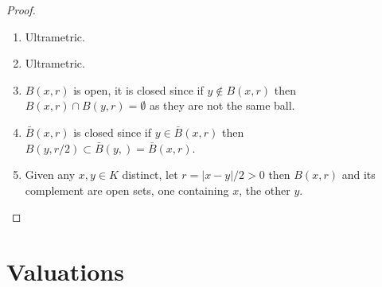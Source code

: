 \documentclass[10pt,]{book}
\newcommand{\gt}{>}
\theoremstyle{plain}
\theoremstyle{definition}
\begin{document}
\begin{proof}
\begin{enumerate}
\item{}Ultrametric.\item{}Ultrametric.\item{}\(B(x,r)\) is open, it is closed since if \(y \not\in B(x,r)\) then \(B(x,r)\cap B(y,r) = \emptyset\) as they are not the same ball.\item{}\(\bar{B}(x,r)\) is closed since if \(y\in \bar{B}(x,r)\) then \(B(y,r/2)\subset\bar{B}(y,) = \bar{B}(x,r)\).\item{}Given any \(x,y\in K\) distinct, let \(r = |x-y|/2 \gt 0\) then \(B (x,r)\) and its complement are open sets, one containing \(x\), the other \(y\).\end{enumerate}
\end{proof}
\typeout{************************************************}
\typeout{************************************************}
\chapter[Valuations]{Valuations}\label{chap-valuations}
\typeout{************************************************}
\typeout{************************************************}
\end{document}
